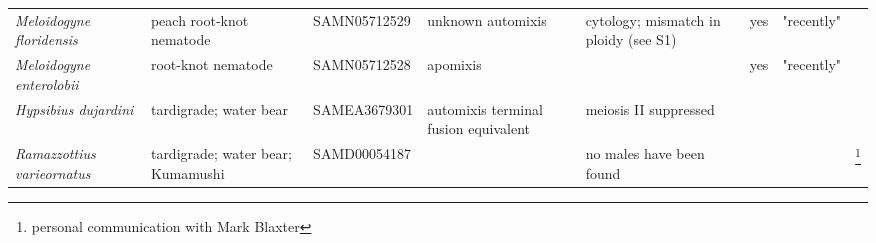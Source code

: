 \documentclass{article}
\begin{document}
\begin{longtable}[H]{ C{.13\textwidth} C{.1\textwidth} C{.12\textwidth} L{.15\textwidth} L{.179\textwidth} C{.04\textwidth} C{.082\textwidth} C{.062\textwidth}}
      \textit{Meloidogyne floridensis} & peach root-knot nematode & SAMN05712529 & unknown automixis & cytology; mismatch in ploidy (see S1) & yes & "recently" & \cite{Handoo2004, Lunt2014} \\
      \textit{Meloidogyne enterolobii} & root-knot nematode & SAMN05712528 & apomixis & & yes & "recently" & \cite{Lunt2014}\\
      \hline
      \textit{Hypsibius dujardini} & tardigrade; water bear & SAMEA3679301 & automixis terminal fusion equivalent & meiosis II suppressed & & & \cite{Ammermann1967} \\
      \textit{Ramazzottius varieornatus} & tardigrade; water bear; Kumamushi & SAMD00054187 & & no males have been found & & & \footnote{personal communication with Mark Blaxter} \\

    \end{longtable}

  \clearpage
  \newpage

  
  {}
\end{document}
